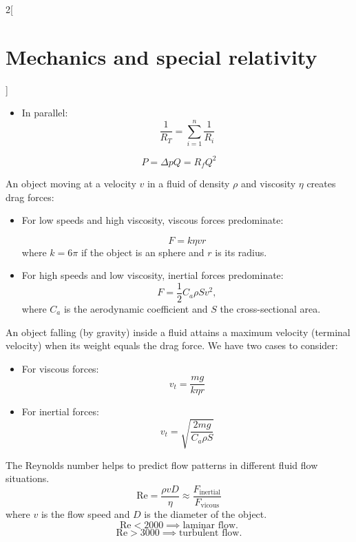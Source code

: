 \documentclass[class=article,10pt,crop=false]{standalone}
\begin{document}
\begin{multicols}{2}[\section{Mechanics and special relativity}]
\begin{concept}
\begin{itemize}
    \item In parallel: $$\frac{1}{R_T}=\sum_{i=1}^n\frac{1}{R_i}$$
\end{itemize}
\end{concept}
\begin{concept}
$$P=\Delta pQ=R_fQ^2$$
\end{concept}
\begin{concept}
An object moving at a velocity $v$ in a fluid of density $\rho$ and viscosity $\eta$ creates drag forces:
\begin{itemize}
    \item For low speeds and high viscosity, viscous forces predominate:\par 
    $$F=k\eta vr$$
    where $k=6\pi$ if the object is an sphere and $r$ is its radius.
    \item For high speeds and low viscosity, inertial forces predominate:
    $$F=\frac{1}{2}C_a\rho Sv^2,$$
    where $C_a$ is the aerodynamic coefficient and $S$ the cross-sectional area.
\end{itemize}
\end{concept}
\begin{concept}
An object falling (by gravity) inside a fluid attains a maximum velocity (terminal velocity) when its weight equals the drag force. We have two cases to consider:
\begin{itemize}
    \item For viscous forces: $$v_t=\frac{mg}{k\eta r}$$
    \item For inertial forces: $$v_t=\sqrt{\frac{2mg}{C_a\rho S}}$$
\end{itemize}
\end{concept}
\begin{concept}
The Reynolds number helps to predict flow patterns in different fluid flow situations.
$$\text{Re}=\frac{\rho vD}{\eta}\approx\frac{F_{\text{inertial}}}{F_{\text{vicous}}}$$
where $v$ is the flow speed and $D$ is the diameter of the object. 
$$\text{Re}<2000\implies\text{laminar flow}.$$
$$\text{Re}>3000\implies\text{turbulent flow}.$$
\end{concept}


\end{multicols}
\end{document}
